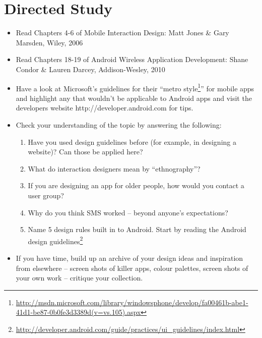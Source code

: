 \section{Directed Study}
\begin{itemize}
\item Read Chapters 4-6  of Mobile Interaction Design: Matt Jones \& Gary Marsden, Wiley, 2006
\item Read Chapters 18-19 of Android Wireless Application Development: Shane Condor \& Lauren Darcey, Addison-Wesley, 2010
\item Have a look at Microsoft’s guidelines  for their “metro style\footnote{\url{http://msdn.microsoft.com/library/windowsphone/develop/fa00461b-abe1-41d1-be87-0b0fe3d3389d(v=vs.105).aspx}}” for mobile apps and highlight any that wouldn’t be applicable to Android apps and visit the developers website http://developer.android.com for tips.
\item Check your understanding of the topic by answering the following:
\begin{enumerate}
\item Have you used design guidelines before (for example, in designing a website)? Can those be applied here?
\item What do interaction designers mean by “ethnography”?
\item If you are designing an app for older people, how would you contact a user group?
\item Why do you think SMS worked – beyond anyone's expectations?
\item Name 5 design rules built in to Android. Start by reading the Android design guidelines\footnote{\url{http://developer.android.com/guide/practices/ui_guidelines/index.html}}
\end{enumerate}
\item If you have time, build up an archive of your design ideas and inspiration from elsewhere – screen shots of killer apps, colour palettes, screen shots of your own work – critique your collection.
\end{itemize}


